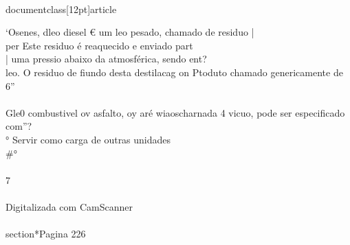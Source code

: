 \\documentclass[12pt]{article}
\begin{document}
{‘Osenes, dleo diesel € um leo pesado, chamado de residuo |\\
per Este residuo é reaquecido e enviado part\\
| uma pressio abaixo da atmosférica, sendo ent?\\
leo. O residuo de fiundo desta destilacag on Ptoduto chamado genericamente de 6”\\
\\
Gle0 combustivel ov asfalto, oy aré wiaoscharnada 4 vicuo, pode ser especificado com”?\\
° Servir como carga de outras unidades \\#°\\
\\
7\\
\\
Digitalizada com CamScanner\\

\\section*{Pagina 226}

}
\end{document}
